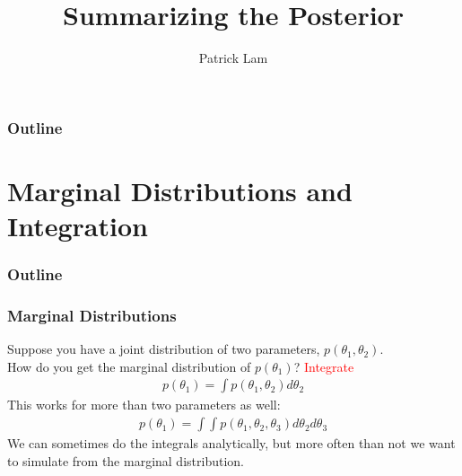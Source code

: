 \documentclass{beamer}
\author{Patrick Lam}
\title{Summarizing the Posterior}
\date{}
\begin{document}
\newcommand{\red}{\textcolor{red}}
\newcommand{\blue}{\textcolor{blue}}
\newcommand{\purple}{\textcolor{purple}}

\frame{\titlepage}

\begin{frame}
\frametitle{Outline}
\tableofcontents
\end{frame}

\section{Marginal Distributions and Integration}

\begin{frame}
\frametitle{Outline}
\tableofcontents[currentsection]
\end{frame}

\begin{frame}
\frametitle{Marginal Distributions}
\pause
Suppose you have a joint distribution of two parameters, $p(\theta_1, \theta_2)$.\\
\pause
\bigskip
How do you get the marginal distribution of $p(\theta_1)$?  \pause \red{Integrate}
\pause
\begin{eqnarray*}
p(\theta_1) = \int p(\theta_1, \theta_2) d\theta_2
\end{eqnarray*}
\pause
This works for more than two parameters as well:
\pause
\begin{eqnarray*}
p(\theta_1) = \int \int p(\theta_1, \theta_2, \theta_3) d\theta_2 d\theta_3
\end{eqnarray*}
\pause
We can sometimes do the integrals analytically, but more often than
not we want to simulate from the marginal distribution.
\end{frame}
\end{document}
